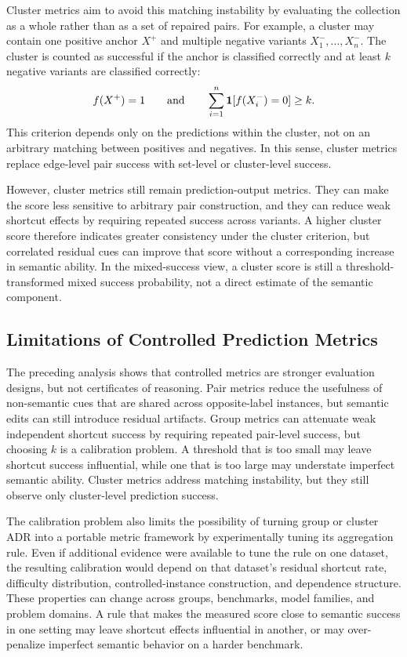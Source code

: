 \documentclass[acmsmall,screen,review,anonymous]{acmart}
\newcounter{experiment}
\begin{document}
Cluster metrics aim to avoid this matching instability by evaluating the
collection as a whole rather than as a set of repaired pairs. For example, a
cluster may contain one positive anchor \(X^+\) and multiple negative
variants \(X^-_1,\ldots,X^-_n\). The cluster is counted as successful if the
anchor is classified correctly and at least \(k\) negative variants are
classified correctly:
\[
f(X^+)=1
\qquad\text{and}\qquad
\sum_{i=1}^{n}\mathbf{1}[f(X^-_i)=0]\ge k.
\]
This criterion depends only on the predictions within the cluster, not on an
arbitrary matching between positives and negatives. In this sense, cluster
metrics replace edge-level pair success with set-level or cluster-level
success.

However, cluster metrics still remain prediction-output metrics. They can
make the score less sensitive to arbitrary pair construction, and they can
reduce weak shortcut effects by requiring repeated success across variants.
A higher cluster score therefore indicates greater consistency under the
cluster criterion, but correlated residual cues can improve that score
without a corresponding increase in semantic ability. In the mixed-success
view, a cluster score is still a threshold-transformed mixed success
probability, not a direct estimate of the semantic component.

\subsection{Limitations of Controlled Prediction Metrics}
\label{sec:controlled-metrics:limitations}

The preceding analysis shows that controlled metrics are stronger evaluation
designs, but not certificates of reasoning. Pair metrics reduce the usefulness
of non-semantic cues that are shared across opposite-label instances, but
semantic edits can still introduce residual artifacts. Group metrics can
attenuate weak independent shortcut success by requiring repeated pair-level
success, but choosing \(k\) is a calibration problem. A threshold that is too
small may leave shortcut success influential, while one that is too large may
understate imperfect semantic ability. Cluster metrics address matching
instability, but they still observe only cluster-level prediction success.

The calibration problem also limits the possibility of turning group or
cluster ADR into a portable metric framework by experimentally tuning its
aggregation rule. Even if additional evidence were available to tune the rule
on one dataset, the resulting calibration would depend on that dataset's
residual shortcut rate, difficulty distribution, controlled-instance
construction, and dependence structure. These properties can change across
groups, benchmarks, model families, and problem domains. A rule that makes
the measured score close to semantic success in one setting may leave
shortcut effects influential in another, or may over-penalize imperfect
semantic behavior on a harder benchmark.
\end{document}

